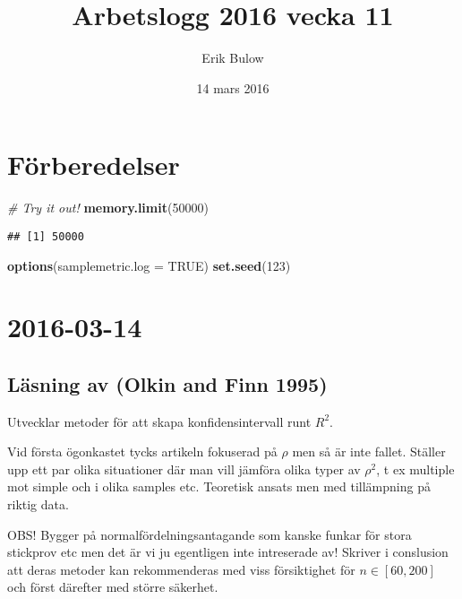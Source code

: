 \documentclass[]{article}
\title{Arbetslogg 2016 vecka 11}
\author{Erik Bulow}
\date{14 mars 2016}
\newenvironment{Shaded}{\begin{snugshade}}{\end{snugshade}}
\newcommand{\KeywordTok}[1]{\textcolor[rgb]{0.13,0.29,0.53}{\textbf{{#1}}}}
\newcommand{\DataTypeTok}[1]{\textcolor[rgb]{0.13,0.29,0.53}{{#1}}}
\newcommand{\DecValTok}[1]{\textcolor[rgb]{0.00,0.00,0.81}{{#1}}}
\newcommand{\CommentTok}[1]{\textcolor[rgb]{0.56,0.35,0.01}{\textit{{#1}}}}
\newcommand{\OtherTok}[1]{\textcolor[rgb]{0.56,0.35,0.01}{{#1}}}
\newcommand{\NormalTok}[1]{{#1}}
\begin{document}
\maketitle

{
\hypersetup{linkcolor=black}
\setcounter{tocdepth}{2}
\tableofcontents
}
\section{Förberedelser}\label{forberedelser}

\begin{Shaded}
\begin{Highlighting}[]
\CommentTok{# Try it out!}
\KeywordTok{memory.limit}\NormalTok{(}\DecValTok{50000}\NormalTok{)}
\end{Highlighting}
\end{Shaded}

\begin{verbatim}
## [1] 50000
\end{verbatim}

\begin{Shaded}
\begin{Highlighting}[]
\KeywordTok{options}\NormalTok{(}\DataTypeTok{samplemetric.log =} \OtherTok{TRUE}\NormalTok{)}
\KeywordTok{set.seed}\NormalTok{(}\DecValTok{123}\NormalTok{)}
\end{Highlighting}
\end{Shaded}

\section{2016-03-14}\label{section}

\subsection{Läsning av (Olkin and Finn
1995)}\label{lasning-av-olkin1995}

Utvecklar metoder för att skapa konfidensintervall runt \(R^2\).

Vid första ögonkastet tycks artikeln fokuserad på \(\rho\) men så är
inte fallet. Ställer upp ett par olika situationer där man vill jämföra
olika typer av \(\rho^2\), t ex multiple mot simple och i olika samples
etc. Teoretisk ansats men med tillämpning på riktig data.

OBS! Bygger på normalfördelningsantagande som kanske funkar för stora
stickprov etc men det är vi ju egentligen inte intreserade av! Skriver i
conslusion att deras metoder kan rekommenderas med viss försiktighet för
\(n \in [60, 200]\) och först därefter med större säkerhet.
\end{document}
